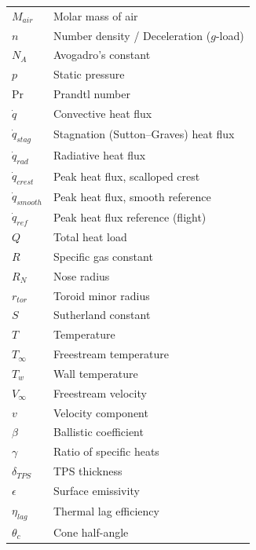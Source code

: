 \begin{longtable}{|p{3.4cm}|p{8.2cm}|}
    $M_{air}$ & Molar mass of air                \\
    $n$         & Number density / Deceleration ($g$-load) \\
    $N_A$       & Avogadro's constant                   \\
    $p$         & Static pressure                       \\
    $\text{Pr}$ & Prandtl number                        \\
    $\dot{q}$   & Convective heat flux                  \\
    $\dot{q}_{stag}$ & Stagnation (Sutton--Graves) heat flux \\
    $\dot{q}_{rad}$  & Radiative heat flux                 \\
    $\dot{q}_{crest}$ & Peak heat flux, scalloped crest    \\
    $\dot{q}_{smooth}$ & Peak heat flux, smooth reference \\
    $\dot{q}_{ref}$  & Peak heat flux reference (flight)   \\
    $Q$         & Total heat load                       \\
    $R$         & Specific gas constant                 \\
    $R_N$       & Nose radius                           \\
    $r_{tor}$ & Toroid minor radius              \\
    $S$         & Sutherland constant                   \\
    $T$         & Temperature                           \\
    $T_\infty$  & Freestream temperature                \\
    $T_w$       & Wall temperature                      \\
    $V_\infty$  & Freestream velocity                   \\
    $v$         & Velocity component                    \\
    $\beta$     & Ballistic coefficient                 \\
    $\gamma$    & Ratio of specific heats               \\
    $\delta_{TPS}$ & TPS thickness               \\
    $\epsilon$  & Surface emissivity                    \\
    $\eta_{lag}$ & Thermal lag efficiency         \\
    $\theta_c$  & Cone half-angle                       \\

\end{longtable}
